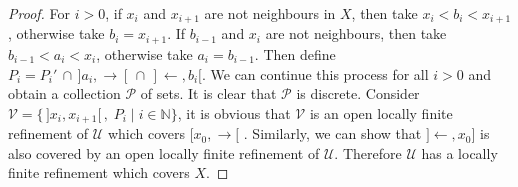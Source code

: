 \documentclass[12pt,oneside,english]{amsbook}
\numberwithin{equation}{section} %
\numberwithin{figure}{section} %
\theoremstyle{plain}
\numberwithin{section}{chapter}
\theoremstyle{plain}
\begin{document}
\begin{proof}
  For $i > 0$, if $x_i$ and $x_{i + 1}$ are not neighbours in $X$, then take $x_i < b_i < x_{i+1}$, otherwise take $b_i = x_{i +1}$. If $b_{i - 1}$ and $x_i$ are not neighbours, then take $b_{i - 1} < a_i < x_i$, otherwise take $a_i = b_{i - 1}$.  
  Then define $P_i = P_{i}' \, \cap \, ]a_{i}, \rightarrow[ \, \cap \, ]\leftarrow, b_{i} [$. We can continue this process for all $i > 0$ and obtain a collection $\mathcal{P}$ of sets. It is clear that $\mathcal{P}$ is discrete. Consider $\mathcal{V} = \{\,]x_i, x_{i+1}[ \, , \; P_{i} \; | \; i \in \mathbb{N} \}$, it is obvious that $\mathcal{V}$ is an open locally finite refinement of $\mathcal{U}$ which covers $[x_{0}, \rightarrow[$ . Similarly, we can show that $]\leftarrow, x_{0}]$ is also covered by an open locally finite refinement of $\mathcal{U}$. Therefore $\mathcal{U}$ has a locally finite refinement which covers $X$.        
\end{proof}
\end{document}

